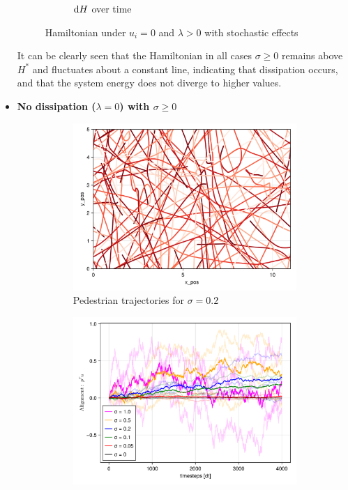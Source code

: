 \begin{itemize}
\begin{figure}[H]
\begin{subfigure}{.49\textwidth}
            \caption{$\mathrm d H$ over time}
            \label{plot:stoc_crys_dh}
        \end{subfigure}
        \caption{Hamiltonian under $u_i = 0$ and $\lambda > 0$ with stochastic effects}
        \label{plot:stoc_crys_hamiltonian}
    \end{figure}
It can be clearly seen that the Hamiltonian in all cases $\sigma \geq 0$ remains above $H^*$ and fluctuates about a constant line, indicating that dissipation occurs, and that the system energy does not diverge to higher values.

    \item \textbf{No dissipation ($\lambda = 0$) with $\sigma \geq 0$}
    \begin{figure}[H]
        \centering
        \begin{subfigure}{.49\textwidth}
            \centering
            \includegraphics[width=\linewidth]{figures/ch5_basic_stoch/traj_stochastic_nodisp_10000.png}
            \caption{Pedestrian trajectories for $\sigma = 0.2$}
            \label{plot:stoc_nodisp_traj}
        \end{subfigure}
        \begin{subfigure}{.49\textwidth}
            \centering
            \includegraphics[width=\linewidth]{figures/ch5_basic_stoch/align_stochastic_nodisp.png}

\end{subfigure}
\end{figure}
\end{itemize}
